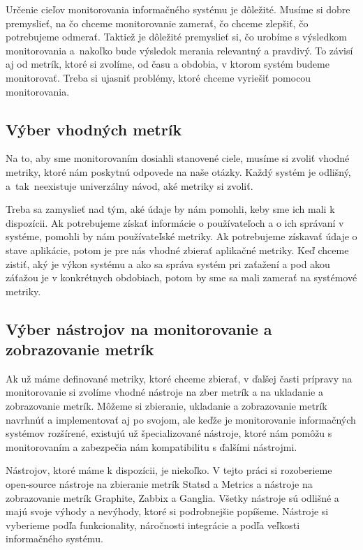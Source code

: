 \documentclass[a4paper, upjsfrontpage, disablespecwarning, thesismargins, thesislinespacing]{rnthesis}
\begin{document}
Určenie cieľov monitorovania informačného systému je dôležité.
Musíme si dobre premyslieť, na čo chceme monitorovanie zamerať, čo chceme zlepšiť, čo potrebujeme odmerať.
Taktiež je dôležité premyslieť si, čo urobíme s výsledkom monitorovania a~nakoľko bude výsledok merania relevantný a pravdivý.
To závisí aj od metrík, ktoré si zvolíme, od času a obdobia, v ktorom systém budeme monitorovať.
Treba si ujasniť problémy, ktoré chceme vyriešiť pomocou monitorovania.

\subsection*{Výber vhodných metrík}

Na to, aby sme monitorovaním dosiahli stanovené ciele, musíme si zvoliť vhodné metriky, 
	ktoré nám poskytnú odpovede na naše otázky.
Každý systém je odlišný, a~tak~neexistuje univerzálny návod, aké metriky si zvoliť.

Treba sa zamyslieť nad tým, aké údaje by nám pomohli, keby sme ich mali k dispozícii.
Ak potrebujeme získať informácie o používateľoch a o ich správaní v systéme, pomohli by nám používateľské metriky.
Ak potrebujeme získavať údaje o stave aplikácie, potom je pre nás vhodné zbierať aplikačné metriky.
Keď chceme zistiť, aký je výkon systému a ako sa správa systém pri zaťažení a pod akou záťažou je v konkrétnych obdobiach, potom by sme sa mali zamerať na systémové metriky.

\subsection*{Výber nástrojov na monitorovanie a zobrazovanie metrík}

Ak už máme definované metriky, ktoré chceme zbierať, v ďalšej časti prípravy na monitorovanie si zvolíme vhodné nástroje na zber 	metrík a na ukladanie a zobrazovanie metrík.
Môžeme si zbieranie, ukladanie a zobrazovanie metrík navrhnúť a implementovať aj po svojom, ale keďže je monitorovanie informačných systémov rozšírené, existujú už špecializované nástroje, ktoré nám pomôžu s monitorovaním a zabezpečia nám kompatibilitu s ďalšími nástrojmi.

Nástrojov, ktoré máme k dispozícii, je niekoľko.
V tejto práci si rozoberieme open-source nástroje na zbieranie metrík Statsd a Metrics a nástroje na zobrazovanie metrík Graphite, Zabbix a Ganglia.
Všetky nástroje sú odlišné a majú svoje výhody a nevýhody, ktoré si podrobnejšie popíšeme.
Nástroje si vyberieme podľa funkcionality, náročnosti integrácie a podľa veľkosti informačného systému.
\end{document}
